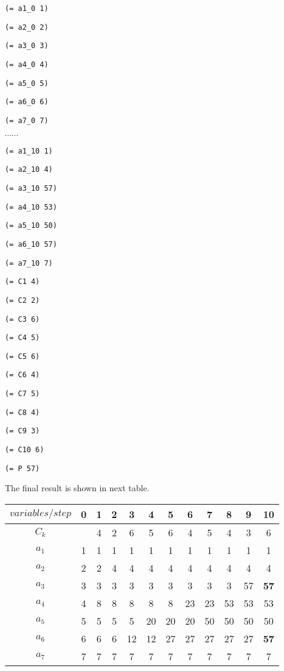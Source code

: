 {\footnotesize

{\tt (= a1\_0 1)}

{\tt (= a2\_0 2)}

{\tt (= a3\_0 3)}

{\tt (= a4\_0 4)}

{\tt (= a5\_0 5)}

{\tt (= a6\_0 6)}

{\tt (= a7\_0 7)}

$\cdots \cdots$

{\tt (= a1\_10 1)}

{\tt (= a2\_10 4)}

{\tt (= a3\_10 57)}

{\tt (= a4\_10 53)}

{\tt (= a5\_10 50)}

{\tt (= a6\_10 57)}

{\tt (= a7\_10 7)}

{\tt (= C1 4)}

{\tt (= C2 2)}

{\tt (= C3 6)}

{\tt (= C4 5)}

{\tt (= C5 6)}

{\tt (= C6 4)}

{\tt (= C7 5)}

{\tt (= C8 4)}

{\tt (= C9 3)}

{\tt (= C10 6)}

{\tt (= P 57)}

}

\vspace{3mm}

The final result is shown in next table.

\begin{center}
\begin{tabular}{|c|c|c|c|c|c|c|c|c|c|c|c|}
  \hline
  $variables/step$ & 0 & 1 & 2 & 3 & 4 & 5 & 6 & 7 & 8 & 9 & 10 \\
  \hline
  $C_{k}$ &   & 4 & 2 & 6 & 5 & 6   & 4  & 5  & 4 & 3 & 6 \\
  $a_{1}$ & 1 & 1 & 1 & 1 & 1 & 1   & 1  & 1  & 1 & 1 & 1 \\
  $a_{2}$ & 2 & 2 & 4 & 4 & 4 & 4   & 4  & 4  & 4 & 4 & 4 \\
  $a_{3}$ & 3 & 3 & 3 & 3 & 3 & 3   & 3  & 3  & 3 & 57 & \textbf{57} \\
  $a_{4}$ & 4 & 8 & 8 & 8 & 8 & 8   & 23 & 23 & 53 & 53 & 53 \\
  $a_{5}$ & 5 & 5 & 5 & 5 & 20 & 20 & 20 & 50 & 50 & 50 & 50 \\
  $a_{6}$ & 6 & 6 & 6 & 12 & 12 & 27 & 27 & 27 & 27 & 27 & \textbf{57} \\
  $a_{7}$ & 7 & 7 & 7 & 7 & 7 & 7 & 7 & 7 & 7 & 7 & 7 \\
  \hline
\end{tabular}
\end{center}


